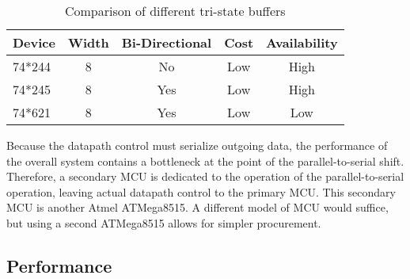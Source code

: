 \begin{table}[bh]
\caption[Buffer Comparison]{Comparison of different tri-state buffers}
\small
\begin{center}
\begin{tabular}{l| c c c c}
\setlength{\tabcolsep}{1pt}
	Device & Width & Bi-Directional & Cost & Availability \\\hline
	74*244 & 8     & No             & Low  & High\\
	74*245 & 8     & Yes            & Low  & High\\
	74*621 & 8     & Yes            & Low  & Low
\end{tabular}
\end{center}
\label{tab:buffer comparison}
\end{table}

Because the datapath control must serialize outgoing data, the performance
of the overall system contains a bottleneck at the point of the 
parallel-to-serial shift. Therefore, a secondary MCU is dedicated to
the operation of the parallel-to-serial operation, leaving actual datapath 
control to the primary MCU. This secondary MCU is another Atmel ATMega8515. A
different model of MCU would suffice, but using a second ATMega8515 allows  
for simpler procurement.


\subsection{Performance}


